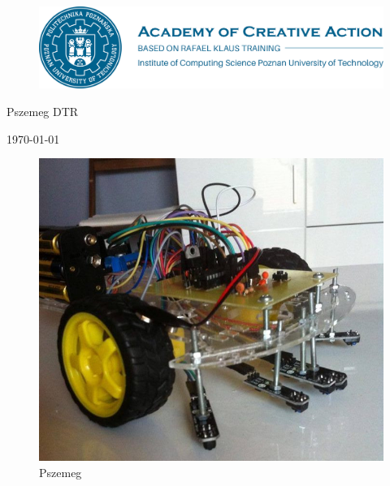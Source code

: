 \documentclass[a4paper,11pt]{article}
\def\SCALE{0.6}
\begin{document}
\begin{center}


	\begin{figure}[htp]
		\centering
		\includegraphics[width=\SCALE
		\paperwidth]{logoakd}
	\end{figure}


	\vspace{0.5cm}
	\begin{LARGE}
		Pszemeg DTR
	\end{LARGE}

	\vspace{0.5cm}
	\today
	\vspace{0.5cm}

	\begin{figure}[H]
		\centering
		\includegraphics[width=\SCALE
		\paperwidth]{Pszemeg}
		\caption{Pszemeg}
	\end{figure}


\end{center}
\end{document}
